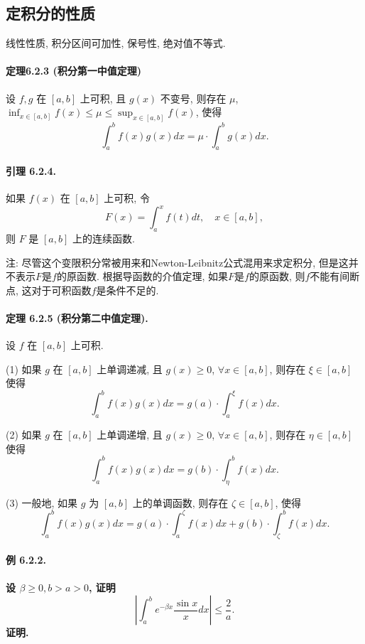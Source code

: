 \subsection{定积分的性质}

线性性质, 积分区间可加性, 保号性, 绝对值不等式.

\paragraph{定理6.2.3 (积分第一中值定理)}

设 $f,g$ 在 $[a,b]$ 上可积, 且 $g(x)$ 不变号, 则存在 $\mu$, $\inf_{x\in[a,b]}f(x)\leqslant\mu\leqslant\sup_{x\in[a,b]}f(x)$,
使得 
\[
\int_{a}^{b}f(x)g(x)dx=\mu\cdot\int_{a}^{b}g(x)dx.
\]


\paragraph{引理 6.2.4. }

如果 $f(x)$ 在 $[a,b]$ 上可积, 令 
\[
F(x)=\int_{a}^{x}f(t)dt,\quad x\in[a,b],
\]
则 $F$ 是 $[a,b]$ 上的连续函数.

注: 尽管这个变限积分常被用来和Newton-Leibnitz公式混用来求定积分, 但是这并不表示$F$是$f$的原函数. 根据导函数的介值定理,
如果$F$是$f$的原函数, 则$f$不能有间断点, 这对于可积函数$f$是条件不足的.

\paragraph{定理 6.2.5 (积分第二中值定理). }

设 $f$ 在 $[a,b]$ 上可积. 

(1) 如果 $g$ 在 $[a,b]$ 上单调递减, 且 $g(x)\geqslant0$, $\forall x\in[a,b]$,
则存在 $\xi\in[a,b]$ 使得 
\[
\int_{a}^{b}f(x)g(x)dx=g(a)\cdot\int_{a}^{\xi}f(x)dx.
\]

(2) 如果 $g$ 在 $[a,b]$ 上单调递增, 且 $g(x)\geqslant0$, $\forall x\in[a,b]$,
则存在 $\eta\in[a,b]$ 使得 
\[
\int_{a}^{b}f(x)g(x)dx=g(b)\cdot\int_{\eta}^{b}f(x)dx.
\]

(3) 一般地, 如果 $g$ 为 $[a,b]$ 上的单调函数, 则存在 $\zeta\in[a,b]$, 使得 
\[
\int_{a}^{b}f(x)g(x)dx=g(a)\cdot\int_{a}^{\zeta}f(x)dx+g(b)\cdot\int_{\zeta}^{b}f(x)dx.
\]


\paragraph{例 6.2.2. }

\paragraph{设 $\beta\geqslant0,b>a>0$, 证明 
	\[
	\left|\int_{a}^{b}e^{-\beta x}\frac{\sin x}{x}dx\right|\leqslant\frac{2}{a}.
	\]
	证明. }


